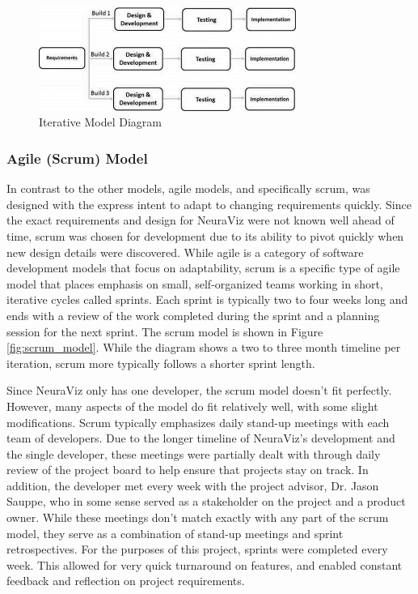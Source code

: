 \begin{figure}[htb]
    \centering
    \includegraphics[width=0.75\textwidth]{02_dev_process/res/sdlc_iterative_model.jpg}
    \caption[Iterative Model Diagram]{Iterative Model Diagram \cite{tutorialspointIterative}}
    \label{fig:iterative_model}
\end{figure}

\subsubsection{Agile (Scrum) Model}
In contrast to the other models, agile models, and specifically scrum, was designed with the express intent to adapt to changing requirements quickly. Since the exact requirements and design for NeuraViz were not known well ahead of time, scrum was chosen for development due to its ability to pivot quickly when new design details were discovered. While agile is a category of software development models that focus on adaptability, scrum is a specific type of agile model that places emphasis on small, self-organized teams working in short, iterative cycles called sprints. Each sprint is typically two to four weeks long and ends with a review of the work completed during the sprint and a planning session for the next sprint. The scrum model is shown in Figure \ref{fig:scrum_model}. While the diagram shows a two to three month timeline per iteration, scrum more typically follows a shorter sprint length.

Since NeuraViz only has one developer, the scrum model doesn't fit perfectly. However, many aspects of the model do fit relatively well, with some slight modifications. Scrum typically emphasizes daily stand-up meetings with each team of developers. Due to the longer timeline of NeuraViz's development and the single developer, these meetings were partially dealt with through daily review of the project board to help ensure that projects stay on track. In addition, the developer met every week with the project advisor, Dr. Jason Sauppe, who in some sense served as a stakeholder on the project and a product owner. While these meetings don't match exactly with any part of the scrum model, they serve as a combination of stand-up meetings and sprint retrospectives. For the purposes of this project, sprints were completed every week. This allowed for very quick turnaround on features, and enabled constant feedback and reflection on project requirements.

